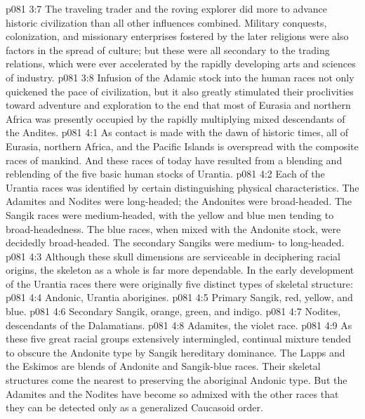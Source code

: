 \vs p081 3:7 The traveling trader and the roving explorer did more to advance historic civilization than all other influences combined. Military conquests, colonization, and missionary enterprises fostered by the later religions were also factors in the spread of culture; but these were all secondary to the trading relations, which were ever accelerated by the rapidly developing arts and sciences of industry.
\vs p081 3:8 Infusion of the Adamic stock into the human races not only quickened the pace of civilization, but it also greatly stimulated their proclivities toward adventure and exploration to the end that most of Eurasia and northern Africa was presently occupied by the rapidly multiplying mixed descendants of the Andites.
%
\vs p081 4:1 As contact is made with the dawn of historic times, all of Eurasia, northern Africa, and the Pacific Islands is overspread with the composite races of mankind. And these races of today have resulted from a blending and reblending of the five basic human stocks of Urantia.
\vs p081 4:2 Each of the Urantia races was identified by certain distinguishing physical characteristics. The Adamites and Nodites were long\hyp{}headed; the Andonites were broad\hyp{}headed. The Sangik races were medium\hyp{}headed, with the yellow and blue men tending to broad\hyp{}headedness. The blue races, when mixed with the Andonite stock, were decidedly broad\hyp{}headed. The secondary Sangiks were medium\hyp{} to long\hyp{}headed.
\vs p081 4:3 Although these skull dimensions are serviceable in deciphering racial origins, the skeleton as a whole is far more dependable. In the early development of the Urantia races there were originally five distinct types of skeletal structure:
\pc \vs p081 4:4 \bibnobreakspace Andonic, Urantia aborigines.
\vs p081 4:5 \bibnobreakspace Primary Sangik, red, yellow, and blue.
\vs p081 4:6 \bibnobreakspace Secondary Sangik, orange, green, and indigo.
\vs p081 4:7 \bibnobreakspace Nodites, descendants of the Dalamatians.
\vs p081 4:8 \bibnobreakspace Adamites, the violet race.
\pc \vs p081 4:9 As these five great racial groups extensively intermingled, continual mixture tended to obscure the Andonite type by Sangik hereditary dominance. The Lapps and the Eskimos are blends of Andonite and Sangik\hyp{}blue races. Their skeletal structures come the nearest to preserving the aboriginal Andonic type. But the Adamites and the Nodites have become so admixed with the other races that they can be detected only as a generalized Caucasoid order.
